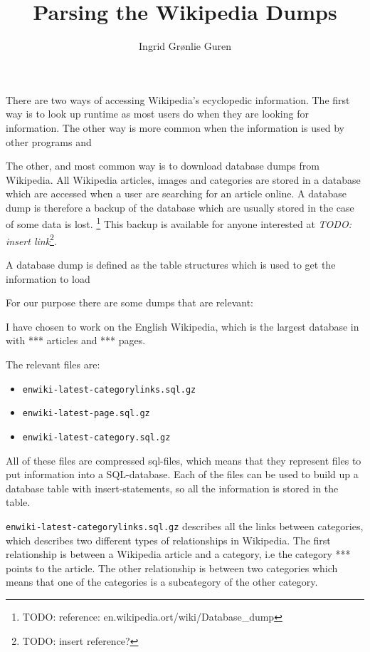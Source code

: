 \documentclass[11pt,english,a4paper]{article}
\title{Parsing the Wikipedia Dumps}
\author{Ingrid Grønlie Guren}
\newcommand{\enwikicatlink}{\texttt{enwiki-latest-categorylinks.sql.gz} }
\newcommand{\enwikipage}{\texttt{enwiki-latest-page.sql.gz} }
\newcommand{\enwikicategory}{\texttt{enwiki-latest-category.sql.gz} }
\begin{document}
\maketitle

There are two ways of accessing Wikipedia's ecyclopedic information. The first way is to look up runtime as most users do when they are looking for information. The other way is more common when the information is used by other programs and


The other, and most common way is to download database dumps from Wikipedia. All Wikipedia articles, images and categories are stored in a database which are accessed when a user are searching for an article online. A database dump is therefore a backup of the database which are usually stored in the case of some data is lost. \footnote{TODO: reference: en.wikipedia.ort/wiki/Database\_dump} This backup is available for anyone interested at \emph{TODO: insert link}\footnote{TODO: insert reference?}. 




A database dump is defined as the table structures which is used to get the information to load

For our purpose there are some dumps that are relevant: 


I have chosen to work on the English Wikipedia, which is the largest database in with *** articles and *** pages. 

The relevant files are: 
\begin{itemize}
\item \enwikicatlink
\item \enwikipage
\item \enwikicategory
\end{itemize}

All of these files are compressed sql-files, which means that they represent files to put information into a SQL-database. Each of the files can be used to build up a database table with insert-statements, so all the information is stored in the table. 

\enwikicatlink describes all the links between categories, which describes two different types of relationships in Wikipedia. The first relationship is between a Wikipedia article and a category, i.e the category *** points to the article. The other relationship is between two categories which means that one of the categories is a subcategory of the other category. 
\end{document}
